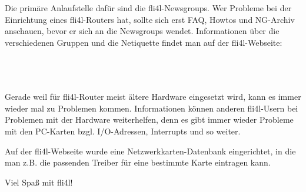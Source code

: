     Die primäre Anlaufstelle dafür sind die fli4l-Newsgroups.  Wer Probleme bei
    der Einrichtung eines fli4l-Routers hat, sollte sich erst FAQ, Howtos und
    NG-Archiv anschauen, bevor er sich an die Newsgroups wendet.  Informationen
    über die verschiedenen Gruppen und die Netiquette findet man auf der
    fli4l-Webseite:

           \\
    \indent{}\\
    \indent{}\\

    Gerade weil für fli4l-Router meist ältere Hardware eingesetzt
    wird, kann es immer wieder mal zu Problemen kommen. 
    Informationen können anderen fli4l-Usern bei Problemen mit der
    Hardware weiterhelfen, denn es gibt immer wieder Probleme mit den
    PC-Karten bzgl. I/O-Adressen, Interrupts und so weiter.

    Auf der fli4l-Webseite wurde eine Netzwerkkarten-Datenbank eingerichtet,
    in die man z.B. die passenden Treiber für eine bestimmte Karte eintragen
    kann.


    \bigskip

    Viel Spaß mit fli4l!
